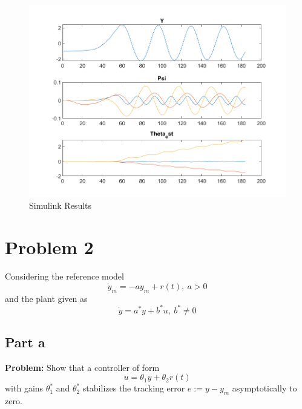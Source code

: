 \documentclass[letter]{article}
\begin{document}
\begin{figure}[h]
	\centering
	\includegraphics[width=\linewidth]{fig/pblm1b_results}
	\caption{Simulink Results}
	\label{fig:pblm1b_results}
\end{figure}

\newpage
\section{Problem 2}
Considering the reference model
\begin{equation}
	\dot{y}_m = -a y_m + r(t), \ a>0
\end{equation}
and the plant given as
\begin{equation}
	\dot{y} = a^*y + b^* u, \ b^* \neq 0
\end{equation}

\subsection{Part a}
\textbf{Problem:}
Show that a controller of form $$u = \theta_1 y + \theta_2 r(t)$$ with gains $\theta^*_1$ and $\theta^*_2$ stabilizes the tracking error $e:= y-y_m$ asymptotically to zero.\\
\end{document}
